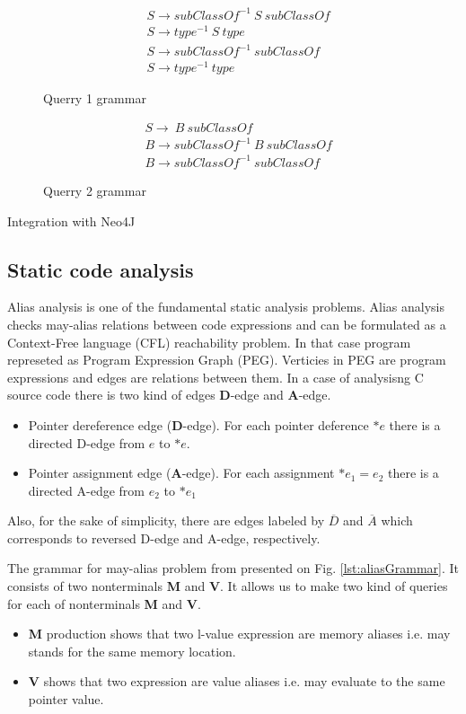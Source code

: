 \begin{figure}[t]
\begin{align*}
& S \rightarrow subClassOf^{-1}\ S\ subClassOf\\
& S \rightarrow type^{-1}\ S\ type\\
& S \rightarrow subClassOf^{-1}\ subClassOf\\
& S \rightarrow type^{-1}\ type
\end{align*}
\caption{Querry 1 grammar}
\label{lst:query1}
\end{figure}

\begin{figure}[t]
\begin{align*}
& S \rightarrow\ B\ subClassOf\\
& B \rightarrow subClassOf^{-1}\ B\ subClassOf\\
& B \rightarrow subClassOf^{-1}\ subClassOf
\end{align*}
\caption{Querry 2 grammar}
\label{lst:query2}
\end{figure}



Integration with Neo4J

\subsection{Static code analysis}

Alias analysis is one of the fundamental static analysis problems\cite{Marlowe}. Alias analysis checks may-alias relations between code expressions and can be formulated as a Context-Free language (CFL) reachability problem\cite{Reps}. In that case program represeted as Program Expression Graph (PEG)\cite{Zheng}. Verticies in PEG are program expressions and edges are relations between them. In a case of analysisng C source code there is two kind of edges \textbf{D}-edge and \textbf{A}-edge.
\begin{itemize}
	\item Pointer dereference edge (\textbf{D}-edge). For each pointer deference $*e$ there is a directed D-edge from $e$ to $*e$.
	\item Pointer assignment edge (\textbf{A}-edge). For each assignment $*e_1=e_2$ there is a directed A-edge from $e_2$ to $*e_1$
\end{itemize}
Also, for the sake of simplicity, there are edges labeled by $\overline{D}$ and $\overline{A}$ which corresponds to reversed D-edge and A-edge, respectively.

The grammar for may-alias problem from \cite{Zheng} presented on Fig. \ref{lst:aliasGrammar}. It consists of two nonterminals \textbf{M} and \textbf{V}. It allows us to make two kind of queries for each of nonterminals \textbf{M} and \textbf{V}.
\begin{itemize}
	\item \textbf{M} production shows that two l-value expression are memory aliases i.e. may stands for the same memory location.
	\item \textbf{V} shows that two expression are value aliases i.e. may evaluate to the same pointer value.
\end{itemize}


